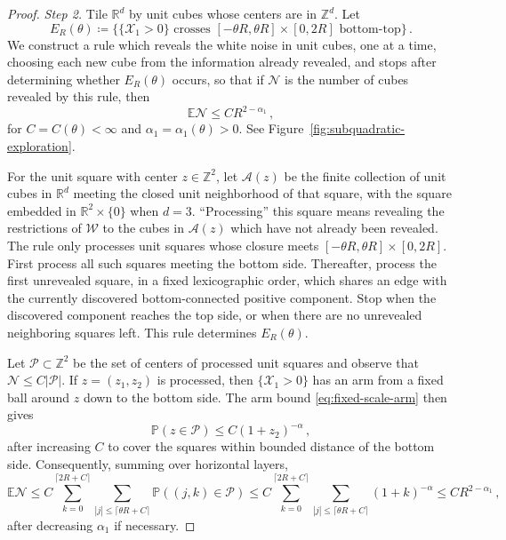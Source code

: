 \documentclass[11pt]{amsart}
\theoremstyle{plain}
\theoremstyle{definition}
\newcommand{\Z}{\mathbb{Z}}
\newcommand{\R}{\mathbb{R}}
\newcommand{\E}{\mathbb{E}}
\renewcommand{\P}{\mathbb{P}}
\begin{document}
\begin{proof}
\smallskip
\noindent\emph{Step 2.}  Tile $\R^d$ by unit cubes whose centers are in $\Z^d$. Let
\[
    E_R(\theta)\coloneqq\{\{\mathcal X_1>0\}\text{ crosses }
    [-\theta R,\theta R]\times[0,2R]\text{ bottom-top}\}\, .
\]
We construct a rule which reveals the white noise in unit cubes, one at a time,
choosing each new cube from the information already
revealed, and stops after determining whether $E_R(\theta)$ occurs,
so that if $\mathcal N$ is the number of cubes revealed by this rule, then 
\[
    \E\mathcal N\leq C R^{2-\alpha_1} \, , 
\]
for $C=C(\theta)<\infty$ and $\alpha_1=\alpha_1(\theta)>0$. See Figure~\ref{fig:subquadratic-exploration}. 

For the unit square with center $z\in\Z^2$, let $\mathcal A(z)$ be the finite
collection of unit cubes in $\R^d$ meeting the closed unit neighborhood of that
square, with the square embedded in $\R^2\times\{0\}$ when $d=3$.
``Processing'' this square means revealing the restrictions of $\mathcal W$ to
the cubes in $\mathcal A(z)$ which have not already been revealed. The rule
only processes unit squares whose closure meets
$[-\theta R,\theta R]\times[0,2R]$. First process all such squares meeting the
bottom side. Thereafter, process the first
unrevealed square, in a fixed lexicographic order, which shares an edge with
the currently discovered bottom-connected positive component. Stop when the
discovered component reaches the top side, or when there are no unrevealed
neighboring squares left. This rule determines $E_R(\theta)$.


Let $\mathcal P\subset\Z^2$ be the set of centers of processed unit squares and
observe that $\mathcal N\leq C|\mathcal P|$. If $z=(z_1,z_2)$ is processed, then $\{\mathcal X_1>0\}$ has an arm
from a fixed ball around $z$ down to the bottom side. The arm bound \eqref{eq:fixed-scale-arm} then gives
\[
    \P(z\in\mathcal P)\leq C(1+z_2)^{-\alpha}\, ,
\]
after increasing $C$ to cover the squares within bounded distance of the bottom
side. Consequently, summing over horizontal layers,
\[
    \E\mathcal N
    \leq C\sum_{k=0}^{\lceil 2R+C\rceil}
        \sum_{|j|\leq\lceil\theta R+C\rceil}
        \P((j,k)\in\mathcal P)
    \leq C\sum_{k=0}^{\lceil 2R+C\rceil}
        \sum_{|j|\leq\lceil\theta R+C\rceil}
        (1+k)^{-\alpha}
    \leq C R^{2-\alpha_1}\, ,
\]
after decreasing $\alpha_1$ if necessary.


\end{proof}
\end{document}
